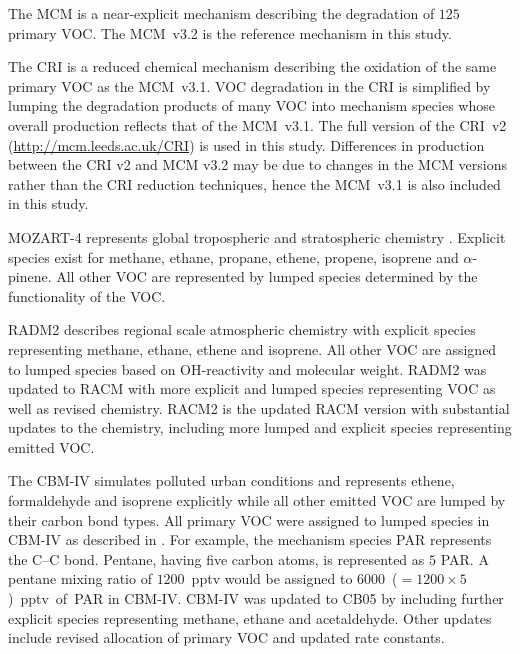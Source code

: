 The MCM \citep{Jenkin:1997, Jenkin:2003, Saunders:2003, Bloss:2005, MCM_Site} is a near-explicit mechanism describing the degradation of $125$ primary VOC. 
The \mbox{MCM v3.2} is the reference mechanism in this study.

The CRI \citep{Jenkin:2008} is a reduced chemical mechanism describing the oxidation of the same primary VOC as the \mbox{MCM v3.1}. 
VOC degradation in the CRI is simplified by lumping the degradation products of many VOC into mechanism species whose overall  production reflects that of the \mbox{MCM v3.1}. 
The full version of the \mbox{CRI v2} (\url{http://mcm.leeds.ac.uk/CRI}) is used in this study.
Differences in  production between the CRI v2 and MCM v3.2 may be due to changes in the MCM versions rather than the CRI reduction techniques, hence the \mbox{MCM v3.1} is also included in this study.

MOZART-4 represents global tropospheric and stratospheric chemistry \citep{Emmons:2010}. 
Explicit species exist for methane, ethane, propane, ethene, propene, isoprene and $\alpha$-pinene.
All other VOC are represented by lumped species determined by the functionality of the VOC.

RADM2 \citep{Stockwell:1990} describes regional scale atmospheric chemistry with explicit species representing methane, ethane, ethene and isoprene. 
All other VOC are assigned to lumped species based on OH-reactivity and molecular weight.
RADM2 was updated to RACM \citep{Stockwell:1997} with more explicit and lumped species representing VOC as well as revised chemistry.
RACM2 is the updated RACM version \citep{Goliff:2013} with substantial updates to the chemistry, including more lumped and explicit species representing emitted VOC.

The CBM-IV \citep{Gery:1989} simulates polluted urban conditions and represents ethene, formaldehyde and isoprene explicitly while all other emitted VOC are lumped by their carbon bond types. 
All primary VOC were assigned to lumped species in CBM-IV as described in \citet{Hogo:1989}. 
For example, the mechanism species PAR represents the C--C bond.
Pentane, having five carbon atoms, is represented as $5$ PAR.
A pentane mixing ratio of \mbox{$1200$ pptv} would be assigned to \mbox{$6000$ ($= 1200 \times 5$) pptv of PAR} in CBM-IV.
CBM-IV was updated to CB05 \citep{Yarwood:2005} by including further explicit species representing methane, ethane and acetaldehyde. 
Other updates include revised allocation of primary VOC and updated rate constants.
%
